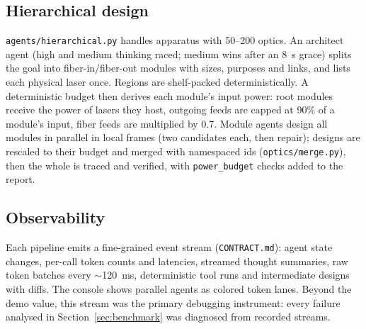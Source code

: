 \documentclass[10pt,twocolumn,letterpaper]{article}
\newcommand{\code}[1]{\texttt{\small #1}}
\begin{document}
\subsection{Hierarchical design}
\code{agents/hierarchical.py} handles apparatus with 50--200 optics. An architect agent (high and medium thinking raced; medium wins after an \SI{8}{\second} grace) splits the goal into fiber-in/fiber-out modules with sizes, purposes and links, and lists each physical laser once. Regions are shelf-packed deterministically. A deterministic budget then derives each module's input power: root modules receive the power of lasers they host, outgoing feeds are capped at 90\% of a module's input, fiber feeds are multiplied by 0.7. Module agents design all modules in parallel in local frames (two candidates each, then repair); designs are rescaled to their budget and merged with namespaced ids (\code{optics/merge.py}), then the whole is traced and verified, with \code{power\_budget} checks added to the report.

\subsection{Observability}
Each pipeline emits a fine-grained event stream (\code{CONTRACT.md}): agent state changes, per-call token counts and latencies, streamed thought summaries, raw token batches every $\sim$\SI{120}{\milli\second}, deterministic tool runs and intermediate designs with diffs. The console shows parallel agents as colored token lanes. Beyond the demo value, this stream was the primary debugging instrument: every failure analysed in Section~\ref{sec:benchmark} was diagnosed from recorded streams.
\end{document}
